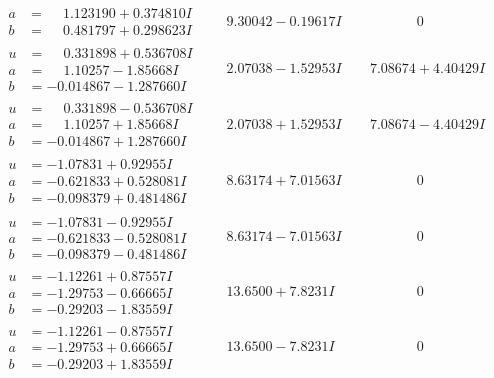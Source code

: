\documentclass[1p]{elsarticle_modified}
\theoremstyle{definition}
\begin{document}
$$\begin{array}{c|c|c}
\begin{aligned}
a &= \phantom{-}1.123190 + 0.374810 I \\
b &= \phantom{-}0.481797 + 0.298623 I\end{aligned}
 & \phantom{-}9.30042 - 0.19617 I & \phantom{-0.000000 } 0 \\ \hline\begin{aligned}
u &= \phantom{-}0.331898 + 0.536708 I \\
a &= \phantom{-}1.10257 - 1.85668 I \\
b &= -0.014867 - 1.287660 I\end{aligned}
 & \phantom{-}2.07038 - 1.52953 I & \phantom{-}7.08674 + 4.40429 I \\ \hline\begin{aligned}
u &= \phantom{-}0.331898 - 0.536708 I \\
a &= \phantom{-}1.10257 + 1.85668 I \\
b &= -0.014867 + 1.287660 I\end{aligned}
 & \phantom{-}2.07038 + 1.52953 I & \phantom{-}7.08674 - 4.40429 I \\ \hline\begin{aligned}
u &= -1.07831 + 0.92955 I \\
a &= -0.621833 + 0.528081 I \\
b &= -0.098379 + 0.481486 I\end{aligned}
 & \phantom{-}8.63174 + 7.01563 I & \phantom{-0.000000 } 0 \\ \hline\begin{aligned}
u &= -1.07831 - 0.92955 I \\
a &= -0.621833 - 0.528081 I \\
b &= -0.098379 - 0.481486 I\end{aligned}
 & \phantom{-}8.63174 - 7.01563 I & \phantom{-0.000000 } 0 \\ \hline\begin{aligned}
u &= -1.12261 + 0.87557 I \\
a &= -1.29753 - 0.66665 I \\
b &= -0.29203 - 1.83559 I\end{aligned}
 & \phantom{-}13.6500 + 7.8231 I & \phantom{-0.000000 } 0 \\ \hline\begin{aligned}
u &= -1.12261 - 0.87557 I \\
a &= -1.29753 + 0.66665 I \\
b &= -0.29203 + 1.83559 I\end{aligned}
 & \phantom{-}13.6500 - 7.8231 I & \phantom{-0.000000 } 0 \\ \hline\begin{aligned}

\end{aligned}
\end{array}$$
\end{document}
